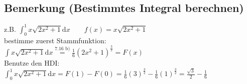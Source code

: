 \documentclass[12pt, titlepage]{article}
\renewcommand{\>}{\rightarrow}
\renewcommand{\*}{\cdot}
\begin{document}
	\subsection{Bemerkung (Bestimmtes Integral berechnen)}
	z.B. $\int_{0}^{1}x\sqrt{2x^2+1}\textrm{d}x\qquad f(x)=x\sqrt{2x^2+1}$\\
	bestimme zuerst Stammfunktion:\\
	$\int x\sqrt{2x^2+1}\textrm{d}x\overset{\textrm{7.16 b)}}{=}\frac{1}{6}(2x^2+1)^{\frac{3}{2}}=F(x)$\\
	Benutze den HDI:\\
	$\int_{0}^{1}x\sqrt{2x^2+1}\textrm{d}x=F(1)-F(0)=\frac{1}{6}(3)^{\frac{3}{2}}-\frac{1}{6}(1)^{\frac{3}{2}}=\frac{\sqrt{3}}{2}-\frac{1}{6}$
\end{document}
